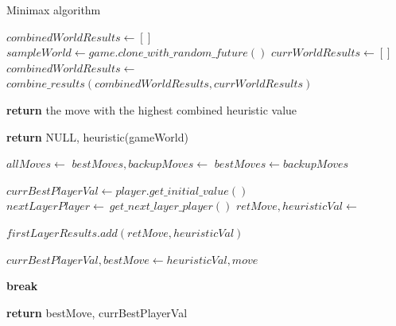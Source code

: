 \begin{algorithm}[H]
    \caption{Minimax algorithm}
    \begin{algorithmic}[1]
            \State $combinedWorldResults \gets []$
                \State $sampleWorld \gets game.clone\_with\_random\_future() $
                \State $currWorldResults \gets [] $
                \State {}
                \State $combinedWorldResults \gets $
                \State \hspace{\algorithmicindent}$combine\_results(combinedWorldResults, currWorldResults) $
            \EndFor
           
            \State \textbf{return} the move with the highest combined heuristic value
        \EndFunction

                \State \textbf{return} {NULL, heuristic(gameWorld)}
            \EndIf

            \State $allMoves \gets $ 
            \State $bestMoves, backupMoves \gets$ 
                \State $bestMoves \gets backupMoves$
            \EndIf

            \State {}
            \State $currBestPlayerVal \gets player.get\_initial\_value() $
                \State {}
                \State $nextLayerPlayer \gets\ get\_next\_layer\_player() $
                \State $retMove, heuristicVal \gets $ 

                    \State $firstLayerResults.add(retMove, heuristicVal)$
                \EndIf

                \State {}
                    \State $currBestPlayerVal, bestMove \gets heuristicVal, move $
                \EndIf

                    \State \textbf{break}
                \EndIf
            \EndFor

            \State \textbf{return} {bestMove, currBestPlayerVal}
        \EndFunction
    \end{algorithmic}
\end{algorithm}



